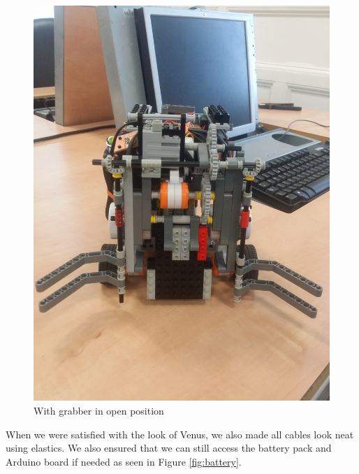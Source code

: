 \documentclass[12pt]{article}
\begin{document}
\begin{figure}[ht]
\begin{minipage}[b]{.48\textwidth}
		\includegraphics[scale=0.065, angle=-90]{grab_open.jpg}
		\caption{With grabber in open position}
		\label{fig:open}
	\end{minipage}
\end{figure}


When we were satisfied with the look of Venus, we also made all cables look neat using elastics. We also ensured that we can still access the battery pack and Arduino board if needed as seen in Figure \ref{fig:battery}.
\end{document}
